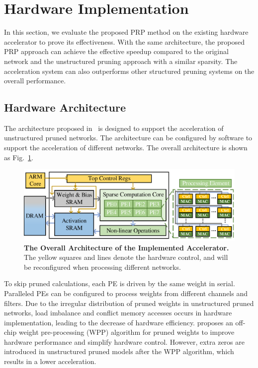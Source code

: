 \documentclass[journal,article,submit,pdftex,moreauthors]{Definitions/mdpi}
\begin{document}
\section{Hardware Implementation}
In this section, we evaluate the proposed PRP method on the existing hardware accelerator to prove its effectiveness. With the same architecture, the proposed PRP approach can achieve the effective speedup compared to the original network and the unstructured pruning approach with a similar sparsity. The acceleration system can also outperforms other structured pruning systems on the overall performance.

\subsection{Hardware Architecture}
The architecture proposed in~\cite{SB} is designed to support the acceleration of unstructured pruned networks. The architecture can be configured by software to support the acceleration of different networks. The overall architecture is shown as Fig.~\ref{fig: ov-arch}.

\begin{figure} [t]
	\centering
	\includegraphics[width=13cm]{figs/arch.pdf}
	\caption{\textbf{The Overall Architecture of the Implemented Accelerator.} The yellow squares and lines denote the hardware control, and will be reconfigured when processing different networks.}
	\label{fig: ov-arch}
\end{figure}

To skip pruned calculations, each PE is driven by the same weight in serial. Paralleled PEs can be configured to process weights from different channels and filters. Due to the irregular distribution of pruned weights in unstructured pruned networks, load imbalance and conflict memory accesses occurs in hardware implementation, leading to the decrease of hardware efficiency. \cite{SB} proposes an off-chip weight pre-processing (WPP) algorithm for pruned weights to improve hardware performance and simplify hardware control. However, extra zeros are introduced in unstructured pruned models after the WPP algorithm, which results in a lower acceleration.
\end{document}
